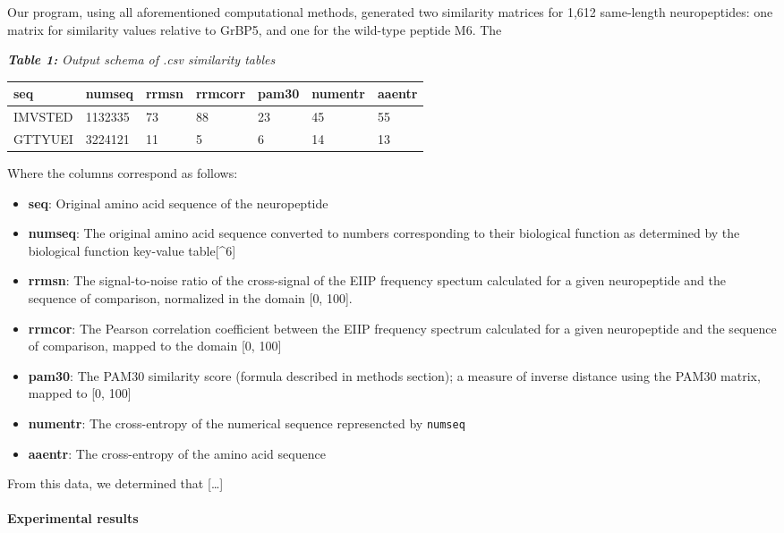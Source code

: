 \documentclass[]{article}
\providecommand{\tightlist}{%
  \setlength{\itemsep}{0pt}\setlength{\parskip}{0pt}}
\let\oldparagraph\paragraph
\renewcommand{\paragraph}[1]{\oldparagraph{#1}\mbox{}}
\begin{document}
Our program, using all aforementioned computational methods, generated two similarity matrices for 1,612 same-length neuropeptides: one matrix for similarity values relative to GrBP5, and one for the wild-type peptide M6. The




\textbf{\emph{Table 1:}} \emph{Output schema of .csv similarity tables}

\begin{longtable}[]{@{}lllllll@{}}
\toprule
\textbf{seq} & numseq & rrmsn & rrmcorr & pam30 & numentr &
aaentr\tabularnewline
\midrule
\endhead
IMVSTED & 1132335 & 73 & 88 & 23 & 45 & 55\tabularnewline
GTTYUEI & 3224121 & 11 & 5 & 6 & 14 & 13\tabularnewline
\bottomrule
\end{longtable}

Where the columns correspond as follows:

\begin{itemize}
\tightlist
\item
  \textbf{seq}: Original amino acid sequence of the neuropeptide
\item
  \textbf{numseq}: The original amino acid sequence converted to numbers
  corresponding to their biological function as determined by the
  biological function key-value table{[}\^{}6{]}
\item
  \textbf{rrmsn}: The signal-to-noise ratio of the cross-signal of the
  EIIP frequency spectum calculated for a given neuropeptide and the
  sequence of comparison, normalized in the domain {[}0, 100{]}.
\item
  \textbf{rrmcor}: The Pearson correlation coefficient between the EIIP
  frequency spectrum calculated for a given neuropeptide and the
  sequence of comparison, mapped to the domain {[}0, 100{]}
\item
  \textbf{pam30}: The PAM30 similarity score (formula described in
  methods section); a measure of inverse distance using the PAM30
  matrix, mapped to {[}0, 100{]}
\item
  \textbf{numentr}: The cross-entropy of the numerical sequence
  represencted by \texttt{numseq}
\item
  \textbf{aaentr}: The cross-entropy of the amino acid sequence
\end{itemize}

From this data, we determined that {[}\ldots{}{]}

\hypertarget{experimental-results-1}{%
\paragraph{Experimental results}\label{experimental-results-1}}
\end{document}
